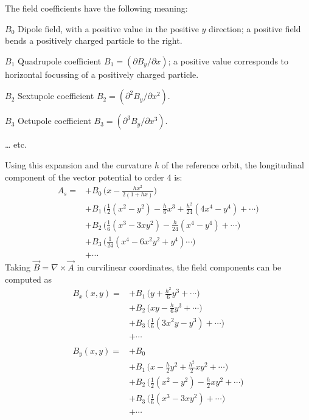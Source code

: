 The field coefficients have the following meaning: 
\begin{madlist}
   \item[$B_0$] 
     Dipole field, with a positive value in the
     positive $y$ direction; a positive field bends a positively
     charged particle to the right.  
   \item[$B_1$] 
     Quadrupole coefficient
     \( B_1 = ( \partial B_y / \partial x ) \);
     a positive value corresponds to horizontal focussing of a
     positively charged particle. 
   \item[$B_2$] 
     Sextupole coefficient
     \( B_2 =  ( \partial^2 B_y / \partial x^2 ) \). 
   \item[$B_3$] 
     Octupole coefficient
     \( B_3 =  ( \partial^3 B_y / \partial x^3 ) \). 
   \item[\ldots] etc.
\end{madlist} 

Using this expansion and the curvature \textit{h} of the reference
orbit, the longitudinal component of the vector potential to order 4 is:  
\begin{equation}
  \begin{aligned}
    A_s = &+ B_0\,\Big(x-\frac{hx^2}{2(1+hx)}\Big) \\
    &+ B_1\,\Big(\frac{1}{2}(x^2-y^2) - \frac{h}{6}x^3 + \frac{h^2}{24}(4x^4-y^4)+\cdots\Big) \\
    &+ B_2\,\Big(\frac{1}{6}(x^3-3xy^2) - \frac{h}{24}(x^4-y^4)+\cdots\Big) \\
    &+ B_3\,\Big(\frac{1}{24}(x^4-6x^2y^2+y^4) \cdots \Big) \\
    &+\cdots
  \end{aligned}
\end{equation}
Taking \(\vec{B} = \nabla \times \vec{A}\) in curvilinear coordinates,
the field components can be computed as  
\begin{equation}\label{eq:field-components}
  \begin{aligned}
B_x(x,y) = &+ B_1\,\Big(y+\frac{h^2}{6}y^3+\cdots\Big) \\
           &+ B_2\,\Big(xy - \frac{h}{6}y^3+\cdots \Big) \\
           &+ B_3\,\Big(\frac{1}{6}(3x^2y-y^3)+ \cdots \Big)\\
           &+\cdots\\
& \\
B_y(x,y)=  &+ B_0   \\
           &+ B_1\,\Big(x-\frac{h}{2}y^2+\frac{h^2}{2}xy^2+\cdots \Big)\\
           &+ B_2\,\Big(\frac{1}{2}(x^2-y^2)-\frac{h}{2}xy^2+\cdots \Big)\\
           &+ B_3\,\Big(\frac{1}{6}(x^3-3xy^2)+ \cdots \Big)\\
           &+\cdots
  \end{aligned}
\end{equation}

